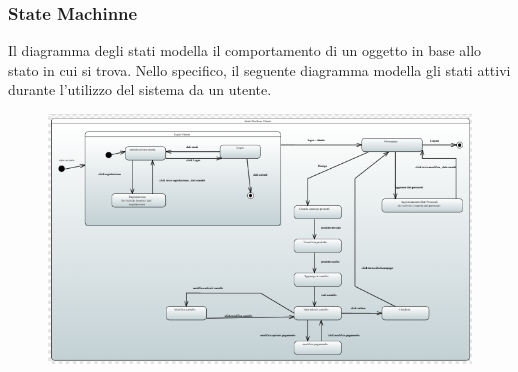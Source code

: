 \documentclass[a4paper,12pt]{article}
\begin{document}
\subsubsection{State Machinne}
Il diagramma degli stati modella il comportamento di un oggetto in base allo stato in cui si trova.
Nello specifico, il seguente diagramma modella gli stati attivi durante l'utilizzo del sistema da un utente.
\begin{figure}[H]
    \centering
    \includegraphics[width=1\textwidth]{../UML/UML png/StateMachine.png}
    \label{fig:State Machine}
\end{figure}
\end{document}
